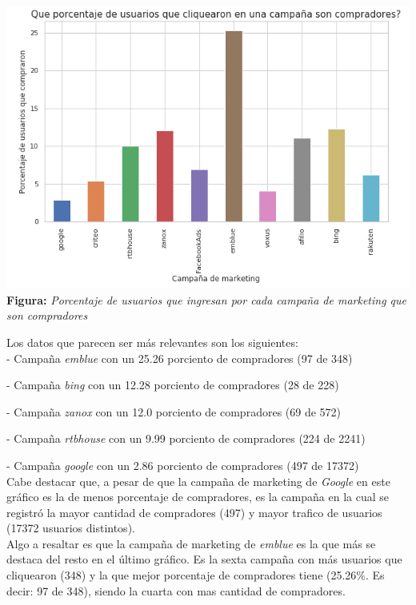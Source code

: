 \documentclass[titlepage,a4paper]{article}
\begin{document}
	 \begin{center}
   \includegraphics[width=14cm]{usuariosPorCampPorcent.jpg}\\
	\textbf{Figura:}  \textit{Porcentaje de usuarios que ingresan por cada campaña de marketing que son compradores}
	\end{center}
	
	Los datos que parecen ser más relevantes son los siguientes: \\
	
- Campaña \textit{emblue} con un 25.26 porciento de compradores (97 de 348)

- Campaña \textit{bing} con un 12.28 porciento de compradores (28 de 228)

- Campaña \textit{zanox} con un 12.0 porciento de compradores (69 de 572)

- Campaña \textit{rtbhouse} con un 9.99 porciento de compradores (224 de 2241)

- Campaña \textit{google} con un 2.86 porciento de compradores (497 de 17372)\\


Cabe destacar que, a pesar de que la campaña de marketing de \textit{Google} en este gráfico es la de menos porcentaje de compradores, es la campaña en la cual se registró la mayor cantidad de compradores (497) y mayor trafico de usuarios (17372 usuarios distintos).\\

Algo a resaltar es que la campaña de marketing de \textit{emblue} es la que más se destaca del resto en el último gráfico. Es la sexta campaña con más usuarios que cliquearon (348) y la que mejor porcentaje de compradores tiene (25.26\%. Es decir: 97 de 348), siendo la cuarta con mas cantidad de compradores.
\end{document}
